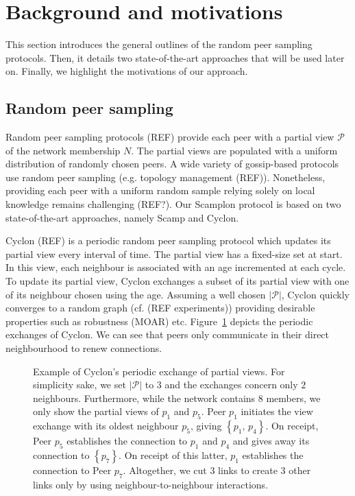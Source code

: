 
\section{Background and motivations}
\label{sec:background}

This section introduces the general outlines of the random peer sampling
protocols. Then, it details two state-of-the-art approaches that will be used
later on. Finally, we highlight the motivations of our approach.

\subsection{Random peer sampling}
Random peer sampling protocols (REF) provide each peer with a partial view
$\mathcal{P}$ of the network membership $N$. The partial views are populated
with a uniform distribution of randomly chosen peers. A wide variety of
gossip-based protocols use random peer sampling (e.g. topology management
(REF)). Nonetheless, providing each peer with a uniform random sample relying
solely on local knowledge remains challenging (REF?).  Our Scamplon protocol is
based on two state-of-the-art approaches, namely Scamp and Cyclon.

\begin{asparadesc}
\item [Cyclon] (REF) is a periodic random peer sampling protocol which updates
  its partial view every interval of time. The partial view has a fixed-size
  set at start. In this view, each neighbour is associated with an age
  incremented at each cycle. To update its partial view, Cyclon exchanges a
  subset of its partial view with one of its neighbour chosen using the age.
  Assuming a well chosen $|\mathcal{P}|$, Cyclon quickly converges to a random
  graph (cf. (REF experiments)) providing desirable properties such as
  robustness (MOAR) etc.  Figure~\ref{fig:cyclonexample} depicts the periodic
  exchanges of Cyclon. We can see that peers only communicate in their direct
  neighbourhood to renew connections.
\end{asparadesc}

\begin{figure}
  \centering
  
  \caption{\label{fig:cyclonexample}Example of Cyclon's periodic exchange of
    partial views. For simplicity sake, we set $|\mathcal{P}|$ to $3$ and the
    exchanges concern only $2$ neighbours. Furthermore, while the network
    contains $8$ members, we only show the partial views of $p_1$ and $p_5$.
    Peer $p_1$ initiates the view exchange with its oldest neighbour $p_5$,
    giving $\left\{p_1,\,p_4\right\}$. On receipt, Peer $p_5$ establishes the
    connection to $p_1$ and $p_4$ and gives away its connection to
    $\left\{p_7\right\}$.  On receipt of this latter, $p_1$ establishes the
    connection to Peer $p_7$. Altogether, we cut $3$ links to create $3$ other
    links only by using neighbour-to-neighbour interactions.}
\end{figure}

